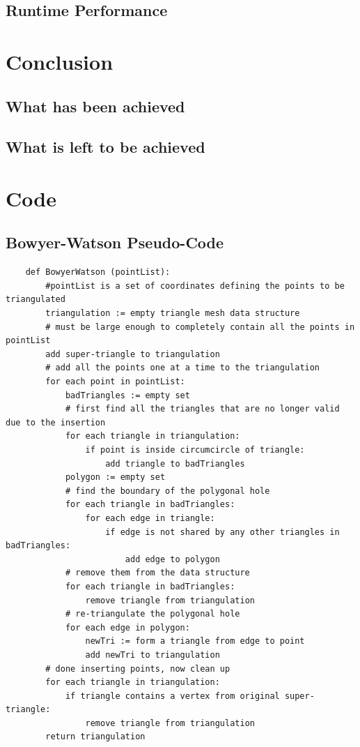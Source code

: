\documentclass[fyp]{socreport}
\begin{document}
\section{Runtime Performance}

\chapter{Conclusion}


\section{What has been achieved}
\section{What is left to be achieved}



\appendix
\chapter{Code}
\section{Bowyer-Watson Pseudo-Code}
\label{code:a1}
\begin{lstlisting}
	def BowyerWatson (pointList):
		#pointList is a set of coordinates defining the points to be triangulated
		triangulation := empty triangle mesh data structure
		# must be large enough to completely contain all the points in pointList
		add super-triangle to triangulation 
		# add all the points one at a time to the triangulation
		for each point in pointList: 
			badTriangles := empty set
			# first find all the triangles that are no longer valid due to the insertion
			for each triangle in triangulation: 
				if point is inside circumcircle of triangle:
					add triangle to badTriangles
			polygon := empty set
			# find the boundary of the polygonal hole
			for each triangle in badTriangles: 
				for each edge in triangle:
					if edge is not shared by any other triangles in badTriangles:
						add edge to polygon
			# remove them from the data structure
			for each triangle in badTriangles:
				remove triangle from triangulation
			# re-triangulate the polygonal hole
			for each edge in polygon:
				newTri := form a triangle from edge to point
				add newTri to triangulation
		# done inserting points, now clean up
		for each triangle in triangulation:
			if triangle contains a vertex from original super-triangle:
				remove triangle from triangulation
		return triangulation
\end{lstlisting}
\end{document}
